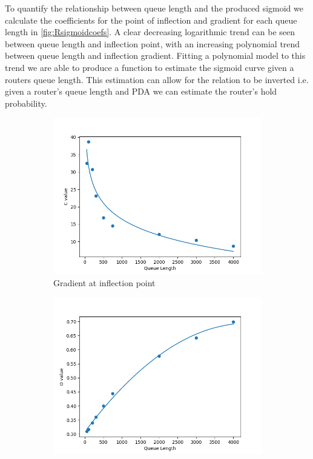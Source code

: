     To quantify the relationship between queue length and the produced sigmoid we calculate the coefficients for the point of inflection and gradient for each queue length in \cref{fig:Rsigmoidcoefs}. A clear decreasing logarithmic trend can be seen between queue length and inflection point, with an increasing polynomial trend between queue length and inflection gradient. Fitting a polynomial model to this trend we are able to produce a function to estimate the sigmoid curve given a routers queue length. This estimation can allow for the relation to be inverted i.e. given a router's queue length and PDA we can estimate the router's hold probability.
    \begin{figure}[H]
        \centering
        \begin{subfigure}{0.475\textwidth}
            \includegraphics[width=\textwidth]{figs/results/qlen_param_c.png}
            \caption{Gradient at inflection point}
        \end{subfigure}
        \begin{subfigure}{0.475\textwidth}
            \includegraphics[width=\textwidth]{figs/results/qlen_param_d.png}

\end{subfigure}
\end{figure}
